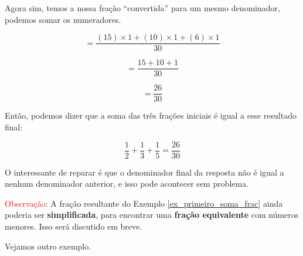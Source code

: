 \begin{exemplo}
    Agora sim, temos a nossa fração ``convertida'' para um mesmo denominador, podemos somar os numeradores.

    \begin{equation}
        =\frac{(15)\times1+(10)\times1 + (6)\times1}{30}
    \end{equation}

    \begin{equation}
        =\frac{15+10+1}{30}
    \end{equation}

    \begin{equation}
        =\frac{26}{30}
    \end{equation}

    Então, podemos dizer que a soma das três frações iniciais é igual a esse resultado final:

    \begin{equation}
        \frac{1}{2}+\frac{1}{3}+\frac{1}{5}=\frac{26}{30}
    \end{equation}

    O interessante de reparar é que o denominador final da resposta não é igual a nenhum denominador anterior, e isso pode acontecer sem problema.
\end{exemplo}

\textcolor{red}{Observação}: A fração resultante do Exemplo \ref{ex_primeiro_soma_frac} ainda poderia ser \textbf{simplificada}, para encontrar uma \textbf{fração equivalente} com números menores. Isso será discutido em breve.

Vejamos outro exemplo.


